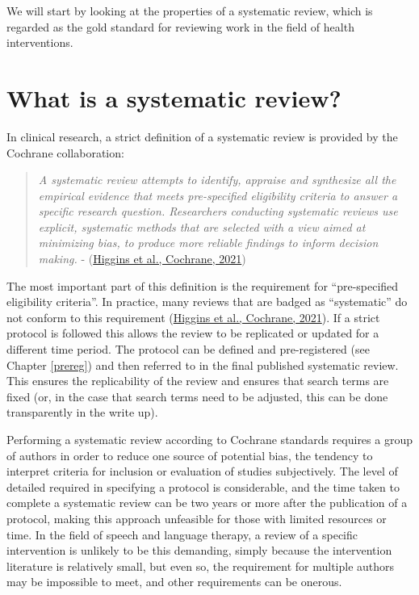 \documentclass{krantz}
\begin{document}
We will start by looking at the properties of a systematic review, which is regarded as the gold standard for reviewing work in the field of health interventions.

\hypertarget{what-is-a-systematic-review}{%
\section{What is a systematic review?}\label{what-is-a-systematic-review}}

In clinical research, a strict definition of a systematic review is provided by the Cochrane collaboration:

\begin{quote}
\emph{A systematic review attempts to identify, appraise and synthesize all the empirical evidence that meets pre-specified eligibility criteria to answer a specific research question. Researchers conducting systematic reviews use explicit, systematic methods that are selected with a view aimed at minimizing bias, to produce more reliable findings to inform decision making.} - (\protect\hyperlink{ref-higgins2021}{Higgins et al., Cochrane, 2021})
\end{quote}

The most important part of this definition is the requirement for ``pre-specified eligibility criteria''. In practice, many reviews that are badged as ``systematic'' do not conform to this requirement (\protect\hyperlink{ref-higgins2021}{Higgins et al., Cochrane, 2021}). If a strict protocol is followed this allows the review to be replicated or updated for a different time period. The protocol can be defined and pre-registered (see Chapter \ref{prereg}) and then referred to in the final published systematic review. This ensures the replicability of the review and ensures that search terms are fixed (or, in the case that search terms need to be adjusted, this can be done transparently in the write up).

Performing a systematic review according to Cochrane standards requires a group of authors in order to reduce one source of potential bias, the tendency to interpret criteria for inclusion or evaluation of studies subjectively. The level of detailed required in specifying a protocol is considerable, and the time taken to complete a systematic review can be two years or more after the publication of a protocol, making this approach unfeasible for those with limited resources or time. In the field of speech and language therapy, a review of a specific intervention is unlikely to be this demanding, simply because the intervention literature is relatively small, but even so, the requirement for multiple authors may be impossible to meet, and other requirements can be onerous.
\end{document}
